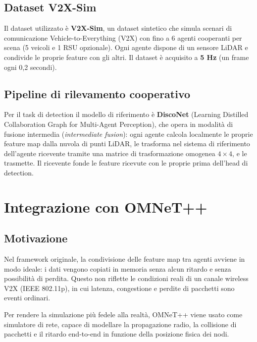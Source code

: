 \documentclass[12pt,a4paper]{article}
\begin{document}
\subsection{Dataset V2X-Sim}

Il dataset utilizzato \`e \textbf{V2X-Sim}, un dataset sintetico che simula scenari di comunicazione
Vehicle-to-Everything (V2X) con fino a 6 agenti cooperanti per scena (5 veicoli e 1 RSU
opzionale). Ogni agente dispone di un sensore LiDAR e condivide le proprie feature con gli altri.
Il dataset \`e acquisito a \textbf{5 Hz} (un frame ogni 0,2 secondi).

\subsection{Pipeline di rilevamento cooperativo}

Per il task di detection il modello di riferimento \`e \textbf{DiscoNet} (Learning Distilled
Collaboration Graph for Multi-Agent Perception), che opera in modalit\`a di fusione intermedia
(\textit{intermediate fusion}): ogni agente calcola localmente le proprie feature map dalla
nuvola di punti LiDAR, le trasforma nel sistema di riferimento dell'agente ricevente tramite una
matrice di trasformazione omogenea $4\times4$, e le trasmette. Il ricevente fonde le feature
ricevute con le proprie prima dell'head di detection.

\section{Integrazione con OMNeT++}

\subsection{Motivazione}

Nel framework originale, la condivisione delle feature map tra agenti avviene in modo ideale:
i dati vengono copiati in memoria senza alcun ritardo e senza possibilit\`a di perdita.
Questo non riflette le condizioni reali di un canale wireless V2X (IEEE 802.11p), in cui
latenza, congestione e perdite di pacchetti sono eventi ordinari.

Per rendere la simulazione pi\`u fedele alla realt\`a, OMNeT++ viene usato come simulatore
di rete, capace di modellare la propagazione radio, la collisione di pacchetti e il
ritardo end-to-end in funzione della posizione fisica dei nodi.
\end{document}
